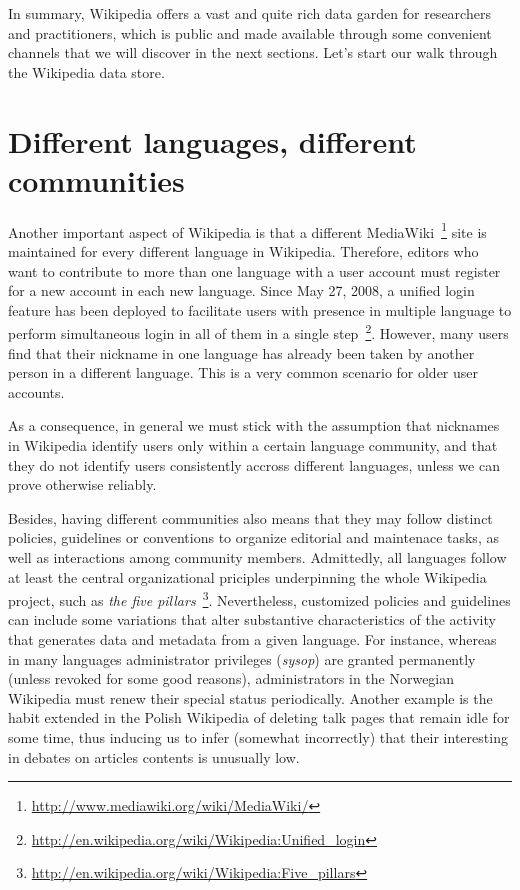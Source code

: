 In summary, Wikipedia offers a vast and quite rich data garden for researchers
and practitioners, which is public and made available through some convenient 
channels that we will discover in the next sections. Let's start our walk 
through the Wikipedia data store.

\section{Different languages, different communities}
\label{sec:langs-communities}
Another important aspect of Wikipedia is that a different MediaWiki~\footnote{\url{http://www.mediawiki.org/wiki/MediaWiki/}} 
site is maintained for every different language in Wikipedia. Therefore, editors
who want to contribute to more than one language with a user account must
register for a new account in each new language. Since May 27, 2008, a unified login feature has
been deployed to facilitate users with presence in multiple language to perform
simultaneous login in all of them in a single step~\footnote{\url{http://en.wikipedia.org/wiki/Wikipedia:Unified_login}}.
However, many users find that their nickname in one language has already
been taken by another person in a different language. This is a very common 
scenario for older user accounts.

As a consequence, in general we must stick with the assumption that nicknames
in Wikipedia identify users only within a certain language community, and that they
do not identify users consistently accross different languages, unless we can
prove otherwise reliably.

Besides, having different communities also means that they may follow distinct
policies, guidelines or conventions to organize editorial and maintenace tasks, as
well as interactions among community members. Admittedly, all languages
follow at least the central organizational priciples underpinning the
whole Wikipedia project, such as 
\textit{the five pillars}~\footnote{\url{http://en.wikipedia.org/wiki/Wikipedia:Five_pillars}}.
Nevertheless, customized policies and guidelines can include some variations that alter substantive
characteristics of the activity that generates data and metadata from a
given language. For instance, whereas in many languages administrator privileges 
(\textit{sysop}) are granted permanently (unless revoked for some good reasons), 
administrators in the Norwegian Wikipedia must renew their special status periodically. 
Another example is the habit extended in the Polish Wikipedia of deleting talk 
pages that remain idle for some time, thus inducing us to infer (somewhat 
incorrectly) that their interesting in debates on articles contents is unusually 
low.

